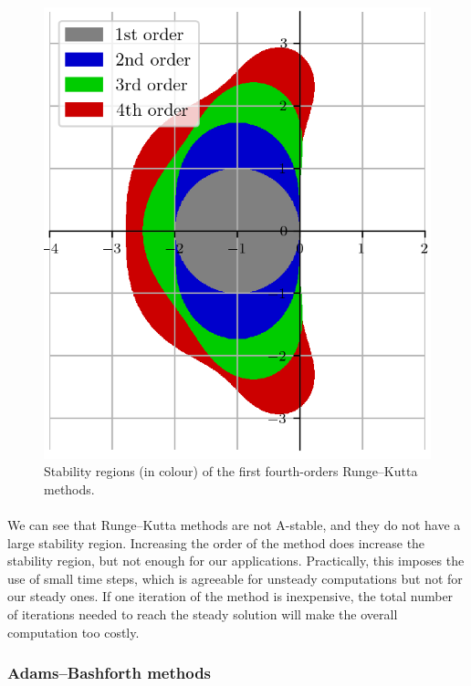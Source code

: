         \begin{figure}
          \centering
          \includegraphics{figures/rk_stab.png}
          \caption{Stability regions (in colour) of the first fourth-orders Runge--Kutta methods.}
          \label{fig:rk_stab}
        \end{figure}

        \paragraph{}
        We can see that Runge--Kutta methods are not A-stable, and they do not have a large stability region.
        Increasing the order of the method does increase the stability region, but not enough for our applications.
        Practically, this imposes the use of small time steps, which is agreeable for unsteady computations but not for our steady ones.
        If one iteration of the method is inexpensive, the total number of iterations needed to reach the steady solution will make the overall computation too costly.


      \subsubsection{Adams--Bashforth methods}

